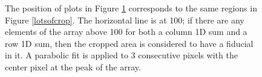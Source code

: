 \documentclass[10pt]{scrartcl}
\begin{document}
\begin{figure}[!ht]
\begin{subfigure}[b]{.3\linewidth}
    \end{subfigure}
    \caption{The position of plots in Figure \ref{lotsofplot} corresponds to the same regions in Figure \ref{lotsofcrop}. The horizontal line is at 100; if there are any elements of the array above 100 for both a column 1D sum and a row 1D sum, then the cropped area is considered to have a fiducial in it. A parabolic fit is applied to 3 consecutive pixels with the center pixel at the peak of the array.}
    \label{lotsofplot}
\end{figure}




\end{document}
